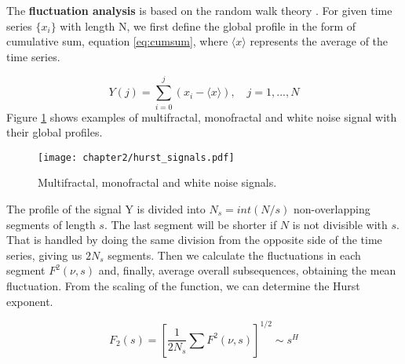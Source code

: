 The \textbf{fluctuation analysis} is based on the random walk theory \cite{kantelhardt2008fractal}. For given time series $\{x_i\}$ with length N, we first define the global profile in the form of cumulative sum, equation \ref{eq:cumsum}, where $\langle x\rangle $ represents the average of the time series. 

\begin{equation}
Y(j) = \sum_{i=0} ^j (x_i - \langle x\rangle), \quad j=1, ..., N
\label{eq:cumsum}
\end{equation}
Figure \ref{fig:hurst_signals} shows examples of multifractal, monofractal and white noise signal with their global profiles.

\begin{figure}[h]
	\centering
	\texttt{[image: chapter2/hurst\_signals.pdf]}
	\caption{Multifractal, monofractal and white noise signals.}
	\label{fig:hurst_signals}
\end{figure}

The profile of the signal Y is divided into $N_s = int (N/s)$ non-overlapping segments of length $s$. The last segment will be shorter if $N$ is not divisible with $s$. That is handled by doing the same division from the opposite side of the time series, giving us $2N_s$ segments. Then we calculate the fluctuations in each segment $F^2(\nu, s)$ and, finally, average overall subsequences, obtaining the mean fluctuation. From the scaling of the function, we can determine the Hurst exponent. 

\begin{equation}
F_2(s) = [\frac{1}{2N_s} \sum F^2(\nu,s)]^{1/2}  \sim s^H
\end{equation} 

